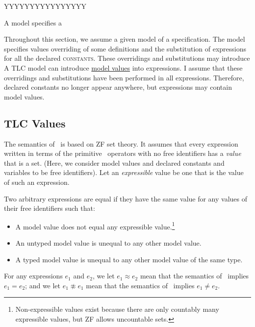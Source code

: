 \documentclass[fleqn,leqno]{article}
\begin{document}
YYYYYYYYYYYYYYYY

A model specifies a 


Throughout this section, we
assume a given model of a specification.  The model specifies values
overriding of some definitions and the substitution of expressions for
all the declared \textsc{constants}.  These overridings and substitutions
may introduce A TLC model can introduce 
  \hyperref{http://tla.msr-inria.inria.fr/tlatoolbox/doc/model/model-values.html}{}{}{model values}
into expressions.  I assume that these overridings and substitutions
have been performed in all expressions.  Therefore, declared constants
no longer appear anywhere, but expressions may contain model values.








\subsection{TLC Values}

\newcommand{\eq}{\ensuremath{\approx}}
\newcommand{\xeq}{\ensuremath{\not\approx}}


The semantics of \tlaplus\ is based on ZF set theory.  It assumes that
every expression written in terms of the primitive \tlaplus\ operators
with no free identifiers has a \emph{value} that is a set.  (Here, we
consider model values and declared constants and variables to be free
identifiers).  Let an \emph{expressible} value be one that is the
value of such an expression.  

Two arbitrary expressions are equal if they have the same value for
any values of their free identifiers such that:
\begin{itemize}
\item A model value does not equal any expressible
value.\footnote{Non-expressible values exist because there are only
countably many expressible values, but ZF allows uncountable sets.}


\item An untyped model value is unequal to any other model value.

\item A typed model value is unequal to any other model value
of the same type.
\end{itemize}
For any expressions $e_{1}$ and $e_{2}$, we let $e_{1}\eq e_{2}$ mean
that the semantics of \tlaplus\ implies $e_{1}=e_{2}$; and we let
$e_{1}\xeq e_{1}$ mean that the semantics of \tlaplus\ implies
$e_{1}\neq e_{2}$.
\end{document}
